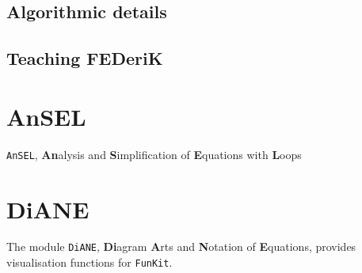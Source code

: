 \documentclass[10pt,prd,nofootinbib,superscriptaddress,twocolumn]{revtex4-2}
\newcommand{\FunKit}{\texttt{FunKit}\xspace}
\newcommand{\DiANE}{\texttt{DiANE}\xspace}
\newcommand{\AnSEL}{\texttt{AnSEL}\xspace}
\begin{document}
\subsection{Algorithmic details}
\label{sec:FEDeriK_algorithm}


\subsection{Teaching FEDeriK}
\label{sec:FEDeriK_teaching}


\section{A\MakeLowercase{n}SEL}
\label{sec:AnSEL}

\AnSEL, \textbf{An}alysis and \textbf{S}implification of \textbf{E}quations with \textbf{L}oops

\clearpage
\section{D\MakeLowercase{i}ANE}
\label{sec:DiANE}

The module \DiANE, \textbf{Di}agram \textbf{A}rts and \textbf{N}otation of \textbf{E}quations, provides visualisation functions for \FunKit. 
\end{document}
